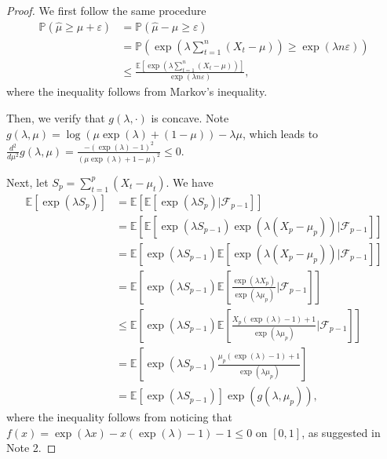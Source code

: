 \begin{proof}
    We first follow the same procedure
    \begin{equation*}
        \begin{aligned}
            \mathbb{P}(\hat{\mu} \geq \mu+\varepsilon)
            &= \mathbb{P}(\hat{\mu} - \mu \geq \varepsilon)\\
            &= \mathbb{P}(\exp(\lambda \sum_{t=1}^n (X_t - \mu)) \geq \exp(\lambda n \varepsilon))\\
            &\leq \frac{\mathbb{E}[\exp(\lambda \sum_{t=1}^n (X_t - \mu))]}{\exp(\lambda n \varepsilon)},
        \end{aligned}
    \end{equation*}
    where the inequality follows from Markov's inequality.

    Then, we verify that $g(\lambda, \cdot)$ is concave.
    Note $g(\lambda, \mu) = \log(\mu \exp(\lambda) + (1 - \mu)) - \lambda \mu$,
    which leads to $\frac{d^2}{d \mu^2} g(\lambda, \mu) = \frac{-(\exp(\lambda) - 1)^2}{(\mu \exp(\lambda) + 1 - \mu)^2} \leq 0$.

    Next, let $S_p = \sum_{t=1}^p (X_t - \mu_t)$. We have
    \begin{equation*}
        \begin{aligned}
            \mathbb{E}[\exp(\lambda S_p)]
            &= \mathbb{E}[\mathbb{E}[\exp(\lambda S_p) | \mathcal{F}_{p-1}]]\\
            &= \mathbb{E}[\mathbb{E}[\exp(\lambda S_{p-1}) \exp(\lambda(X_p - \mu_p)) | \mathcal{F}_{p-1}]]\\
            &= \mathbb{E}[\exp(\lambda S_{p-1}) \mathbb{E}[\exp(\lambda(X_p - \mu_p)) | \mathcal{F}_{p-1}]]\\
            &= \mathbb{E}[\exp(\lambda S_{p-1}) \mathbb{E}[\frac{\exp(\lambda X_p)}{\exp(\lambda \mu_p)} | \mathcal{F}_{p-1}]]\\
            &\leq \mathbb{E}[\exp(\lambda S_{p-1}) \mathbb{E}[\frac{X_p (\exp(\lambda) - 1) + 1}{\exp(\lambda \mu_p)} | \mathcal{F}_{p-1}]]\\
            &= \mathbb{E}[\exp(\lambda S_{p-1}) \frac{\mu_p(\exp(\lambda) - 1) + 1}{\exp(\lambda \mu_p)}]\\
            &= \mathbb{E}[\exp(\lambda S_{p-1})] \exp(g(\lambda, \mu_p)),
        \end{aligned}
    \end{equation*}
    where the inequality follows from noticing that $f(x) = \exp(\lambda x) - x(\exp(\lambda) - 1) - 1 \leq 0$ on $[0, 1]$, as suggested in Note 2.


\end{proof}
